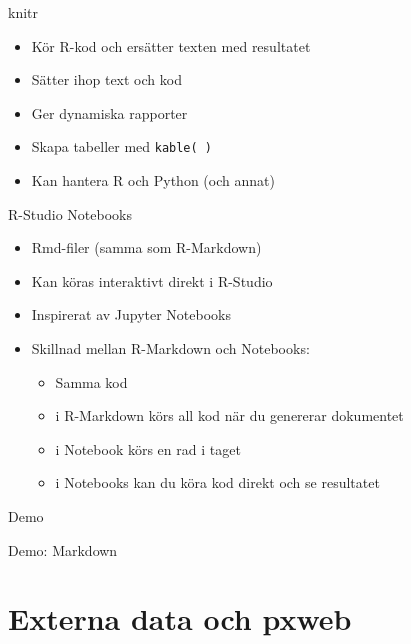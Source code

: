 \documentclass[
  11pt,
  ignorenonframetext,
  handout]{beamer}
\providecommand{\tightlist}{%
  \setlength{\itemsep}{0pt}\setlength{\parskip}{0pt}}
\begin{document}
\begin{frame}{knitr}
\protect{}\label{knitr}
\begin{itemize}
\tightlist
\item
  Kör R-kod och ersätter texten med resultatet
\item
  Sätter ihop text och kod
\item
  Ger dynamiska rapporter
\item
  Skapa tabeller med \texttt{kable( )}
\item
  Kan hantera R och Python (och annat)
\end{itemize}
\end{frame}

\begin{frame}{R-Studio Notebooks}
\protect{}\label{r-studio-notebooks}
\begin{itemize}
\tightlist
\item
  Rmd-filer (samma som R-Markdown)
\item
  Kan köras interaktivt direkt i R-Studio
\item
  Inspirerat av Jupyter Notebooks
\item
  Skillnad mellan R-Markdown och Notebooks:

  \begin{itemize}
  \tightlist
  \item
    Samma kod
  \item
    i R-Markdown körs all kod när du genererar dokumentet
  \item
    i Notebook körs en rad i taget
  \item
    i Notebooks kan du köra kod direkt och se resultatet
  \end{itemize}
\end{itemize}
\end{frame}

\begin{frame}{Demo}
\protect{}\label{demo-2}
\begin{block}{Demo: Markdown}
\protect{}\label{demo-markdown}
\end{block}
\end{frame}

\section{Externa data och pxweb}\label{externa-data-och-pxweb}
\end{document}
